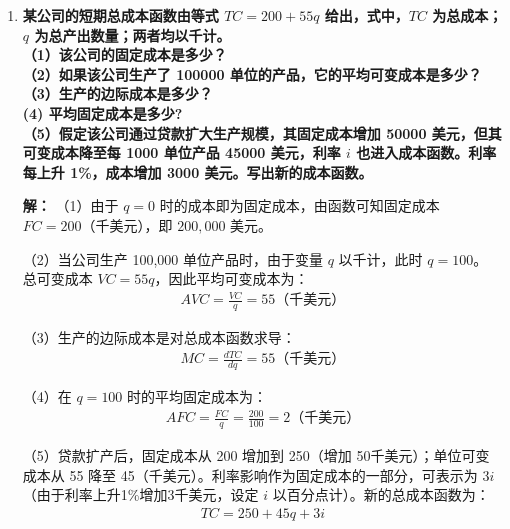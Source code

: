 \begin{enumerate}[label=\textbf{\arabic*.}, leftmargin=*]
		（3）在长期中，资本与劳动均可变。为了最小化总成本，企业应使要素的边际技术替代率等于要素价格比，即
		$$\frac{MP_L}{MP_K} = \frac{w}{r}$$
		已知生产函数 $q = 5KL$，则 $MP_L = 5K$，$MP_K = 5L$。代入最优条件：
		\[
		\begin{aligned}
			\frac{5K}{5L} = \frac{5000}{10000} \implies \frac{K}{L} = \frac{1}{2}
		\end{aligned}
		\]
		因此，新工厂的资本/劳动比率应设定为 $1/2$。无论目标产出是多少，维持这一要素投入比例始终能实现长期成本最小化。
		\newpage
		\item \textbf{某公司的短期总成本函数由等式 $TC = 200 + 55q$ 给出，式中，$TC$ 为总成本；$q$ 为总产出数量；两者均以千计。\\（1）该公司的固定成本是多少？\\（2）如果该公司生产了 100000 单位的产品，它的平均可变成本是多少？\\（3）生产的边际成本是多少？\\(4) 平均固定成本是多少?\\（5）假定该公司通过贷款扩大生产规模，其固定成本增加 50000 美元，但其可变成本降至每 1000 单位产品 45000 美元，利率 $i$ 也进入成本函数。利率每上升 1\%，成本增加 3000 美元。写出新的成本函数。}
		
		\textbf{解：}
		（1）由于 $q=0$ 时的成本即为固定成本，由函数可知固定成本 $FC = 200$（千美元），即 $200,000$ 美元。
		
		（2）当公司生产 100,000 单位产品时，由于变量 $q$ 以千计，此时 $q = 100$。
		总可变成本 $VC = 55q$，因此平均可变成本为：
		\[
		\begin{aligned}
			AVC = \frac{VC}{q} = 55 \text{（千美元）}
		\end{aligned}
		\]
		
		（3）生产的边际成本是对总成本函数求导：
		\[
		\begin{aligned}
			MC = \frac{dTC}{dq} = 55 \text{（千美元）}
		\end{aligned}
		\]
		
		（4）在 $q = 100$ 时的平均固定成本为：
		\[
		\begin{aligned}
			AFC = \frac{FC}{q} = \frac{200}{100} = 2 \text{（千美元）}
		\end{aligned}
		\]
		
		（5）贷款扩产后，固定成本从 200 增加到 250（增加 50千美元）；单位可变成本从 55 降至 45（千美元）。利率影响作为固定成本的一部分，可表示为 $3i$（由于利率上升1\%增加3千美元，设定 $i$ 以百分点计）。新的总成本函数为：
		\[
		\begin{aligned}
			TC = 250 + 45q + 3i
		\end{aligned}
		\]
		

\end{enumerate}
